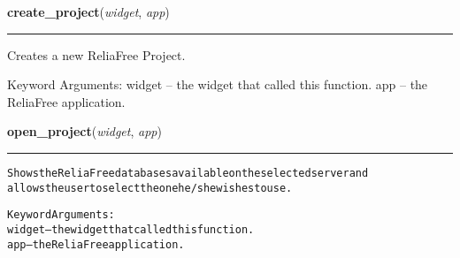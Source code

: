     \label{reliafree:utilities:create_project}

    \vspace{0.5ex}

\hspace{.8\funcindent}\begin{boxedminipage}{\funcwidth}

    \raggedright \textbf{create\_project}(\textit{widget}, \textit{app})

    \vspace{-1.5ex}

    \rule{\textwidth}{0.5\fboxrule}
\setlength{\parskip}{2ex}
    Creates a new ReliaFree Project.

    Keyword Arguments: widget -- the widget that called this function. app
    -- the ReliaFree application.

\setlength{\parskip}{1ex}
    \end{boxedminipage}

    \label{reliafree:utilities:open_project}

    \vspace{0.5ex}

\hspace{.8\funcindent}\begin{boxedminipage}{\funcwidth}

    \raggedright \textbf{open\_project}(\textit{widget}, \textit{app})

    \vspace{-1.5ex}

    \rule{\textwidth}{0.5\fboxrule}
\setlength{\parskip}{2ex}
\begin{alltt}
Shows the ReliaFree databases available on the selected server and
allows the user to select the one he/she wishes to use.

Keyword Arguments:
widget -- the widget that called this function.
   app -- the ReliaFree application.
\end{alltt}

\setlength{\parskip}{1ex}
    \end{boxedminipage}

    \label{reliafree:utilities:save_project}

